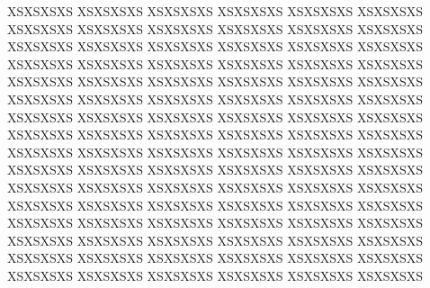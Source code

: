  XSXSXSXS  XSXSXSXS  XSXSXSXS  XSXSXSXS  XSXSXSXS  XSXSXSXS  XSXSXSXS  XSXSXSXS  XSXSXSXS  XSXSXSXS  XSXSXSXS  XSXSXSXS  XSXSXSXS  XSXSXSXS  XSXSXSXS  XSXSXSXS  XSXSXSXS  XSXSXSXS  XSXSXSXS  XSXSXSXS  XSXSXSXS  XSXSXSXS  XSXSXSXS  XSXSXSXS  XSXSXSXS  XSXSXSXS  XSXSXSXS  XSXSXSXS  XSXSXSXS  XSXSXSXS  XSXSXSXS  XSXSXSXS  XSXSXSXS  XSXSXSXS  XSXSXSXS  XSXSXSXS  XSXSXSXS  XSXSXSXS  XSXSXSXS  XSXSXSXS  XSXSXSXS  XSXSXSXS  XSXSXSXS  XSXSXSXS  XSXSXSXS  XSXSXSXS  XSXSXSXS  XSXSXSXS  XSXSXSXS  XSXSXSXS  XSXSXSXS  XSXSXSXS  XSXSXSXS  XSXSXSXS  XSXSXSXS  XSXSXSXS  XSXSXSXS  XSXSXSXS  XSXSXSXS  XSXSXSXS  XSXSXSXS  XSXSXSXS  XSXSXSXS  XSXSXSXS  XSXSXSXS  XSXSXSXS  XSXSXSXS  XSXSXSXS  XSXSXSXS  XSXSXSXS  XSXSXSXS  XSXSXSXS  XSXSXSXS  XSXSXSXS  XSXSXSXS  XSXSXSXS  XSXSXSXS  XSXSXSXS  XSXSXSXS  XSXSXSXS  XSXSXSXS  XSXSXSXS  XSXSXSXS  XSXSXSXS  XSXSXSXS  XSXSXSXS  XSXSXSXS  XSXSXSXS  XSXSXSXS  XSXSXSXS  XSXSXSXS  XSXSXSXS  XSXSXSXS  XSXSXSXS  XSXSXSXS  XSXSXSXS 